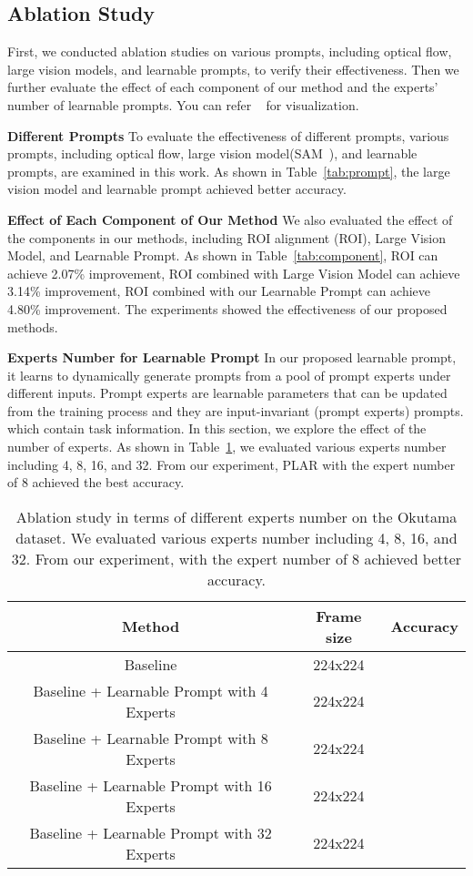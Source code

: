 \documentclass[letterpaper, 10 pt, conference]{ieeeconf}
\begin{document}
\subsection{Ablation Study}
First, we conducted ablation studies on various prompts, including optical flow, large vision models, and learnable prompts, to verify their effectiveness. Then we further evaluate the effect of each component of our method and the experts' number of learnable prompts. You can refer ~\cite{wang2023prompt} for visualization.



\textbf{Different Prompts}
To evaluate the effectiveness of different prompts, various prompts, including optical flow, large vision model(SAM~\cite{kirillov2023segment}), and learnable prompts, are examined in this work. As shown in Table~\ref{tab:prompt}, the large vision model and learnable prompt achieved better accuracy.

\textbf{Effect of Each Component of Our Method}
We also evaluated the effect of the components in our methods, including ROI alignment (ROI), Large Vision Model, and Learnable Prompt. As shown in Table~\ref{tab:component}, ROI can achieve 2.07\% improvement, ROI combined with Large Vision Model can achieve 3.14\% improvement, ROI combined with our Learnable Prompt can achieve 4.80\% improvement. The experiments showed the effectiveness of our proposed methods.


\textbf{Experts Number for Learnable Prompt}
In our proposed learnable prompt, it learns to dynamically generate prompts from a pool of prompt experts under different inputs. Prompt experts are learnable parameters that can be updated from the training process and they are input-invariant (prompt experts) prompts. which contain task information. In this section, we explore the effect of the number of experts. As shown in Table~\ref{tab:expert_num}, we evaluated various experts number including 4, 8, 16, and 32. From our experiment, PLAR with the expert number of 8 achieved the best accuracy.
\begin{table}[h]
\centering
\begin{tabular}{c c c }
\toprule
Method & Frame size  & Accuracy    \\
\midrule
Baseline & 224x224 &   \\
Baseline + Learnable Prompt with 4 Experts  & 224x224 &   \\
Baseline + Learnable Prompt with 8 Experts & 224x224 &   \\
Baseline + Learnable Prompt with 16 Experts & 224x224 &   \\
Baseline + Learnable Prompt with 32 Experts & 224x224 &   \\
\bottomrule
\end{tabular}
\caption{Ablation study in terms of different experts number on the Okutama dataset. We evaluated various experts number including 4, 8, 16, and 32. From our experiment, with the expert number of 8 achieved better accuracy.}
\label{tab:expert_num}
\vspace{-4mm}
\end{table} 
\end{document}
